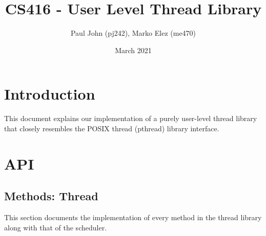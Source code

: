 \documentclass{article}
\title{CS416 - User Level Thread Library}
\author{Paul John (pj242), Marko Elez (me470)}
\date{March 2021}
\begin{document}
\maketitle

\section{Introduction}
This document explains our implementation of a purely user-level thread library that closely resembles the POSIX thread (pthread) library interface.

\section{API}
\subsection{Methods: Thread}
This section documents the implementation of every method in the thread library along with that of the scheduler.
\end{document}
